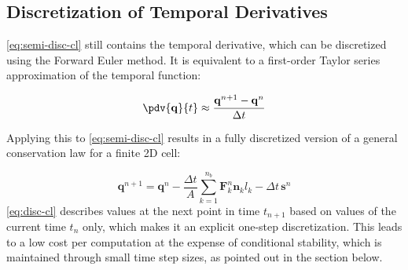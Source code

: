 




\subsection{Discretization of Temporal Derivatives}\label{sec:disc-time}

\autoref{eq:semi-disc-cl} still contains the temporal derivative, which can be discretized using the Forward Euler method. It is equivalent to a first-order Taylor series approximation of the temporal function:

\begin{equation}\label{eq:forward-euler}
	\pdv{\mathbf{q}}{t} \approx \frac{\mathbf{q}^{n+1} - \mathbf{q}^{n}}{\Delta t}
\end{equation}

Applying this to \autoref{eq:semi-disc-cl} results in a fully discretized version of a general conservation law for a finite \gls{2D} cell:

\begin{equation}\label{eq:disc-cl}
	\mathbf{q}^{n+1} =
	\mathbf{q}^n
	- \frac{\Delta t}{A} \sum_{k=1}^{n_b} \mathbf{F}_k^n \mathbf{n}_k l_k
	- \Delta t \, \mathbf{s}^n
\end{equation}
\autoref{eq:disc-cl} describes values at the next %
point in time $t_{n+1}$ based on values of the current %
time $t_n$ only, which makes it an explicit one-step discretization. 
This leads to a low cost per computation at the expense of conditional stability, which is maintained through small time step sizes, as pointed out in the section below.

